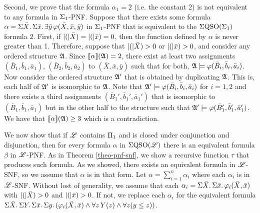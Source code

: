 \vspace{1em}
Second, we prove that the formula $\alpha_{1} = 2$ (i.e. the constant $2$) is not equivalent to any formula in $\Sigma_{1}$-PNF. Suppose that there exists some formula $\alpha = \Sigma{\bar{X}}.\,\Sigma{\bar{x}}.\,\exists\bar{y}\, \varphi(\bar{X},\bar{x},\bar{y})$ in $\Sigma_{1}$-PNF that is equivalent to the $\Sigma{\rm QSO}(\Sigma_{1})$ formula $2$. 
First, if $\vert ( \vert\bar{X}) = \vert ( \vert\bar{x}) = 0$, then the function defined by $\alpha$ is never greater than 1. 
Therefore, suppose that $\vert ( \vert\bar{X}) > 0$ or $\vert ( \vert\bar{x}) > 0$, and consider any ordered structure $\mathfrak{A}$. 
Since ${\llbracket{}{\alpha}\rrbracket}(\mathfrak{A}) = 2$, there exist at least two assignments $(\bar{B}_1,\bar{b}_1,\bar{a}_1)$, $(\bar{B}_2,\bar{b}_2,\bar{a}_2)$ to $(\bar{X},\bar{x},\bar{y})$ such that for both, $\mathfrak{A}\models\varphi(\bar{B}_i,\bar{b}_i,\bar{a}_i)$. Now consider the ordered structure $\mathfrak{A}'$ that is obtained by duplicating $\mathfrak{A}$. This is, each half of $\mathfrak{A}'$ is isomorphic to $\mathfrak{A}$. Note that $\mathfrak{A}'\models\varphi(\bar{B}_i,\bar{b}_i,\bar{a}_i)$ for $i = 1,2$ and there exists a third assignments $(\bar{B}_1',\bar{b}_1',\bar{a}_1')$ that is isomorphic to $(\bar{B}_1,\bar{b}_1,\bar{a}_1)$ but in the other half to the structure such that $\mathfrak{A}'\models\varphi(\bar{B}_1',\bar{b}_1',\bar{a}_1')$. We have that ${\llbracket{}{\alpha}\rrbracket}(\mathfrak{A}) \geq 3$ which is a contradiction.

\vspace{1em}
We now show that if $\mathscr{L}$ contains $\Pi_{1}$ and is closed under conjunction and disjunction, then for every formula $\alpha$ in $\Sigma{\rm QSO}(\mathscr{L})$ there is an equivalent formula $\beta$ in $\mathscr{L}$-PNF. As in Theorem \ref{theo-pnf-snf}, we show a recursive function $\tau$ that produces such formula. As we showed, there exists an equivalent formula in $\mathscr{L}$-SNF, so we assume that $\alpha$ is in that form. Let $\alpha = \sum_{i = 1}^n \alpha_i$ where each $\alpha_i$ is in $\mathscr{L}$-SNF. 
Without lost of generality, we assume that each $\alpha_i = \Sigma{\bar{X}}.\,\Sigma{\bar{x}}.\,\varphi_i(\bar{X},\bar{x})$ with $\vert ( \vert\bar{X}) > 0$ and $\vert ( \vert\bar{x}) > 0$. If not, we replace each $\alpha_i$ for the equivalent formula $\Sigma{\bar{X}}.\, \Sigma{Y}.\,\Sigma{\bar{x}}.\,\Sigma{y}.\,(\varphi_i(\bar{X},\bar{x})\wedge\forall z\,Y(z) \wedge \forall z(y \leq z))$.


